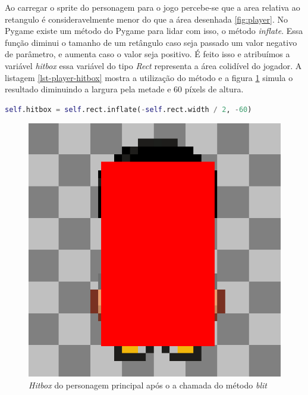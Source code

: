 

Ao carregar o sprite do personagem para o jogo percebe-se que a area relativa ao retangulo é consideravelmente menor do que a área desenhada \ref{fig:player}.
No Pygame existe um método do Pygame para lidar com isso, o método \textit{inflate}. Essa função diminui o tamanho de um retângulo caso seja passado um valor negativo de parâmetro, e aumenta caso o valor seja positivo. É feito isso e atribuímos a variável \textit{hitbox} essa variável do tipo \textit{Rect} representa a área colidível do jogador. A listagem \ref{lst-player-hitbox} mostra a utilização do método e a figura \ref{fig:player-hitbox} simula o resultado diminuindo a largura pela metade e 60 píxels de altura.

\begin{lstlisting}[language=Python,breaklines, caption= Uso da Função \textit{inflate}, label= lst-player-hitbox]
self.hitbox = self.rect.inflate(-self.rect.width / 2, -60)
\end{lstlisting}
\begin{figure}[h!]
    \centering
    \includegraphics[width=0.7\linewidth]{figuras/player-hitbox.png}
    \caption{\textit{Hitbox} do personagem principal após o a chamada do método \textit{blit}}
    \label{fig:player-hitbox}
\end{figure}

